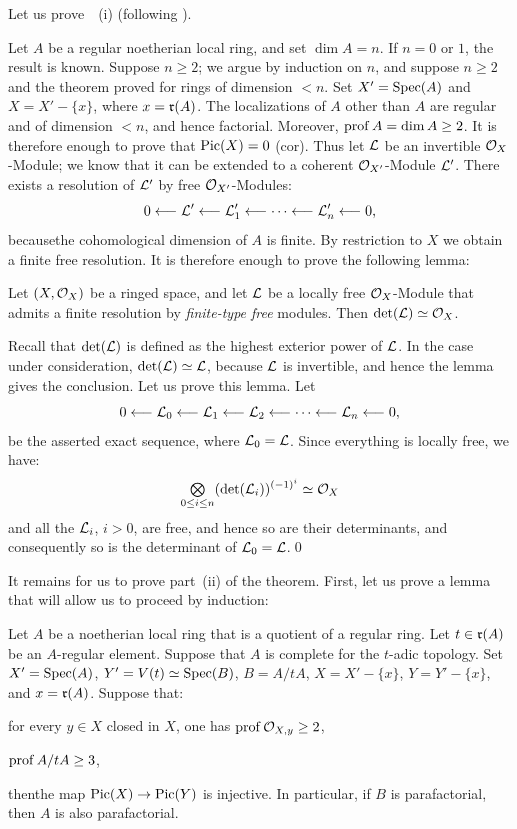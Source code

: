 Let us prove~~(i) (following ).

Let $A$ be a regular noetherian local ring, and set $\dim A=n$. If $n=0$ or $1$, the result is known. Suppose $n\geq 2$; we argue by induction on $n$, and suppose $n\geq 2$ and the theorem proved for rings of dimension $<n$. Set $X'=\operatorname{Spec}(A)$ and $X=X'-\{x\}$, where $x=\mathfrak{r}(A)$. The localizations of $A$ other than $A$ are regular and of dimension $<n$, and hence factorial. Moreover, $\operatorname{prof} A = \dim A\geq 2$. It is therefore enough to prove that $\operatorname{Pic}(X)=0$ (cor\ptbl{}). Thus let ${\mathcal L}$ be an invertible $\mathcal O_X$-Module; we know that it can be extended to a coherent $\mathcal O_{X'}$-Module ${\mathcal L}'$. There exists a resolution of ${\mathcal L}'$ by free $\mathcal O_{X'}$-Modules:
\[
0\longleftarrow {\mathcal L}'\longleftarrow {\mathcal L}'_1\longleftarrow\cdots\longleftarrow{\mathcal L}'_n\longleftarrow 0{},
\]
because\pageoriginale the cohomological dimension of $A$ is finite. By restriction to $X$ we obtain a finite free resolution. It is therefore enough to prove the following lemma:

\begin{lemme} \label{XI.3.15} Let $(X, \mathcal O_X)$ be a ringed space, and let ${\mathcal L}$ be a locally free $\mathcal O_X$-Module that admits a finite resolution by \emph{finite-type free} modules. Then $\det({\mathcal L}) \simeq \mathcal O_X$.
\end{lemme}

Recall that $\det({\mathcal L})$ is defined as the highest exterior power of ${\mathcal L}$. In the case under consideration, $\det({\mathcal L}) \simeq{\mathcal L}$, because ${\mathcal L}$ is invertible, and hence the lemma gives the conclusion. Let us prove this lemma. Let
\[
0\longleftarrow {\mathcal L}_0\longleftarrow {\mathcal L}_1\longleftarrow {\mathcal L}_2\longleftarrow\cdots\longleftarrow{\mathcal L}_n\longleftarrow 0{},
\]
be the asserted exact sequence, where ${\mathcal L}_0={\mathcal L}$. Since everything is locally free, we have:
\[
\mathop{\textstyle\bigotimes}\limits_{0\leq i\leq n}(\det({\mathcal L}_i))^{(-1)^i} \simeq \mathcal O_X
\]
and all the ${\mathcal L}_i$, $i>0$, are free, and hence so are their determinants, and consequently so is the determinant of ${\mathcal L}_0 = {\mathcal L}$.\qed

\medskip
It remains for us to prove part~(ii) of the theorem. First, let us prove a lemma that will allow us to proceed by induction:

\begin{lemme} \label{XI.3.16}
Let $A$ be a noetherian local ring that is a quotient of a regular ring. Let $t\in\mathfrak{r}(A)$ be an $A$-regular element. Suppose that $A$ is complete for the $t$-adic topology. Set $X'=\operatorname{Spec}(A)$, $Y'=V(t)\simeq \operatorname{Spec}(B)$, $B=A/tA$, $X=X'-\{x\}$, $Y=Y'-\{x\}$, and $x=\mathfrak{r}(A)$. Suppose that:
\begin{enumeratea}
\item
for every $y\in X$ closed in $X$, one has $\operatorname{prof}\mathcal O_{X, y}\geq 2$,
\item
$\operatorname{prof} A/tA\geq 3$,
\end{enumeratea}
\noindent
then\pageoriginale the map $\operatorname{Pic}(X)\to\operatorname{Pic}(Y)$ is injective. In particular, if $B$ is parafactorial, then $A$ is also parafactorial.
\end{lemme}

